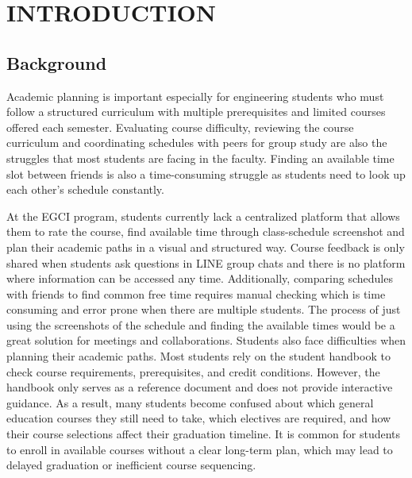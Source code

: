 \chapter{INTRODUCTION}

\section{Background}
\setlength{\parindent}{0pt}
\hspace{1.6 cm}Academic planning is important especially for engineering students who must follow a structured curriculum with multiple prerequisites and limited courses offered each semester. Evaluating course difficulty, reviewing the course curriculum and coordinating schedules with peers for group study are also the struggles that most students are facing in the faculty. Finding an available time slot between friends is also a time-consuming struggle as students need to look up each other’s schedule constantly.


\hspace{1.6 cm}At the EGCI program, students currently lack a centralized platform that allows them to rate the course, find available time through class-schedule screenshot and plan their academic paths in a visual and structured way. Course feedback is only shared when students ask questions in LINE group chats and there is no platform where information can be accessed any time. Additionally, comparing schedules with friends to find common free time requires manual checking which is time consuming and error prone when there are multiple students. The process of just using the screenshots of the schedule and finding the available times would be a great solution for  meetings and collaborations. Students also face difficulties when planning their academic paths. Most students rely on the student handbook to check course requirements, prerequisites, and credit conditions. However, the handbook only serves as a reference document and does not provide interactive guidance. As a result, many students become confused about which general education courses they still need to take, which electives are required, and how their course selections affect their graduation timeline. It is common for students to enroll in available courses without a clear long-term plan, which may lead to delayed graduation or inefficient course sequencing.

